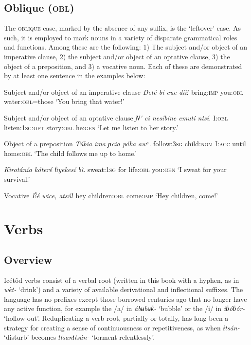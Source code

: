 \subsection{Oblique (\textsc{obl})}


The \textsc{oblique} case, marked by the absence of any suffix, is the ‘leftover’ case. As such, it is employed to mark nouns in a variety of disparate grammatical roles and functions. Among these are the following: 1) The subject and/or object of an imperative clause, 2) the subject and/or object of an optative clause, 3) the object of a preposition, and 3) a vocative noun. Each of these are demonstrated by at least one sentence in the examples below:




Subject and/or object of an imperative clause
\textit{Deté     bi     cue dííǃ}
bring:\textsc{imp}   you:\textsc{obl}   water:\textsc{obl}=those
‘You bring that water!’

Subject and/or object of an optative clause
\textit{Ɲ}\textit{\'{} ci   nesíbine     emuti     ntsí.}
I:\textsc{obl}   listen:\textsc{1sg:opt}   story:\textsc{obl}   he:\textsc{gen}
‘Let me listen to her story.’




Object of a preposition
\textit{Túbia     ima     ɲcia   páka   awᵃ.}
follow:\textsc{3sg}   child:\textsc{nom}   I:\textsc{acc}   until   home:\textsc{obl}
‘The child follows me up to home.’




\textit{Kirotánía  kóteré   ɦyekesí   bì.}
sweat:\textsc{1sg}   for     life:\textsc{obl}   you:\textsc{gen}
‘I sweat for your survival.’





Vocative
\textit{\'{E}é   wice,     atsúǃ}
hey   children:\textsc{obl}  come:\textsc{imp}
‘Hey children, come!’




\section{Verbs}



\subsection{Overview}


Icétôd verbs consist of a verbal root (written in this book with a hyphen, as in \textit{wèt-} ‘drink’) and a variety of available derivational and inflectional suffixes. The language has no prefixes except those borrowed centuries ago that no longer have any active function, for example the /a/ in \textit{ábʉbʉƙ-} ‘bubble’ or the /i/ in \textit{iɓóɓór-} ‘hollow out’. Reduplicating a verb root, partially or totally, has long been a strategy for creating a sense of continuousness or repetitiveness, as when \textit{ɨtsán-} ‘disturb’ becomes \textit{ɨtsanɨtsán-} ‘torment relentlessly’. 

